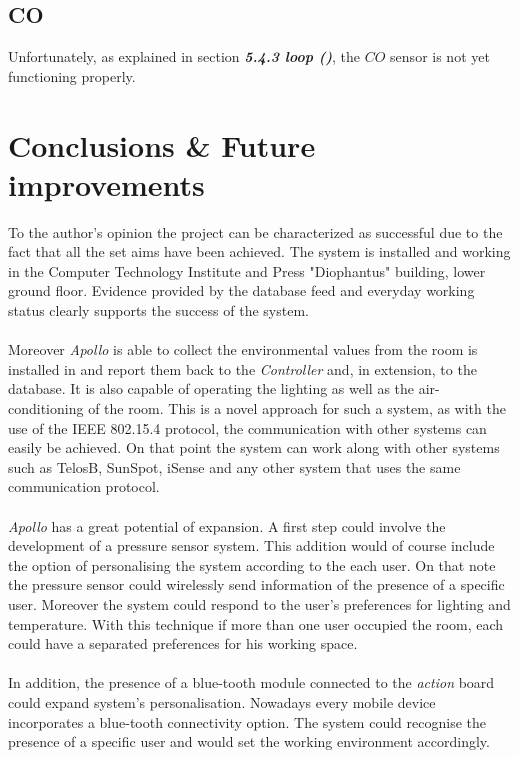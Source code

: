 \documentclass[12pt,a4paper,draft]{report}
\begin{document}
\section{CO}
%
Unfortunately, as explained in section \textit{\textbf{5.4.3 loop ()}}, the $CO$ sensor is not yet functioning properly.
\newpage
%
\chapter{Conclusions \& Future improvements}
%
To the author's opinion the project can be characterized as successful due to the fact that all the set aims have been achieved.
The system is installed and working in the Computer Technology Institute and Press "Diophantus" building, lower ground floor.
Evidence provided by the database feed and everyday working status clearly supports the success of the system.\\
\ \\
Moreover \emph{Apollo} is able to collect the environmental values from the room is installed in and report them back to the \textit{Controller} and, in extension, to the database.
It is also capable of operating the lighting as well as the air-conditioning of the room.
This is a novel approach for such a system, as with the use of the IEEE 802.15.4 protocol, the communication with other systems can easily be achieved.
On that point the system can work along with other systems such as TelosB, SunSpot, iSense and any other system that uses the same communication protocol. \\
\ \\
\emph{Apollo} has a great potential of expansion.
A first step could involve the development of a pressure sensor system.
This addition would of course include the option of personalising the system according to the each user.
On that note the pressure sensor could wirelessly send information of the presence of a specific user.
Moreover the system could respond to the user's preferences for lighting and temperature.
With this technique if more than one user occupied the room, each could have a separated preferences for his working space.\\
\ \\
In addition, the presence of a blue-tooth module connected to the \textit{action} board could expand system's personalisation.
Nowadays every mobile device incorporates a blue-tooth connectivity option.
The system could recognise the presence of a specific user and would set the working environment accordingly.
\end{document}

